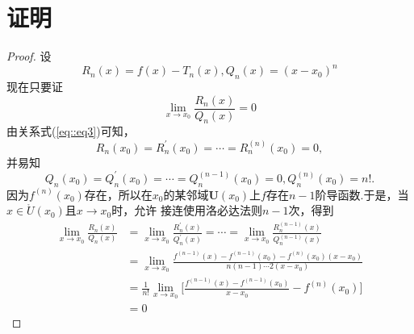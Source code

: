 \newpage
\section{证明}
\begin{proof}
    设
    $$R_n(x)=f(x)-T_n(x),Q_n(x)=(x-x_0)^n$$
    现在只要证
    $$\lim_{x \to x_0}\frac{R_n(x)}{Q_n(x)}=0$$
    由关系式(\ref{eq::eq3})可知，
    $$R_n(x_0)=R^{'}_n(x_0)=\cdots=R^{(n)}_n(x_0)=0,$$
    并易知
    $$Q_n(x_0)=Q^{'}_n(x_0)=\cdots=Q^{(n-1)}_n(x_0)=0,Q^{(n)}_n(x_0)=n!.$$
    因为$f^{(n)}(x_0)$存在，所以在$x_0$的某邻域$\mathbf{U}(x_0)$上$f$存在$n-1$阶导函数.于是，当$x\in \mathring{U}(x_0) $且$x \to x_0$时，允许
    接连使用洛必达法则$n-1$次，得到
    $$\begin{aligned}
        \lim_{x \to x_0}\frac{R_n(x)}{Q_n(x)}&=\lim_{x \to x_0}\frac{R^{'}_n(x)}{Q^{'}_n(x)}=\cdots=\lim_{x \to x_0}\frac{R^{(n-1)}_n(x)}{Q^{(n-1)}_n(x)} \\
        &=\lim_{x \to x_0}\frac{f^{(n-1)}(x)-f^{(n-1)}(x_0)-f^{(n)}(x_0)(x-x_0)}{n(n-1)\cdots 2(x-x_0)} \\
        &=\frac{1}{n!}\lim_{x \to x_0}\Big[\frac{f^{(n-1)}(x)-f^{(n-1)}(x_0)}{x-x_0}-f^{(n)}(x_0)\Big] \\
        &=0
    \end{aligned}$$
\end{proof}